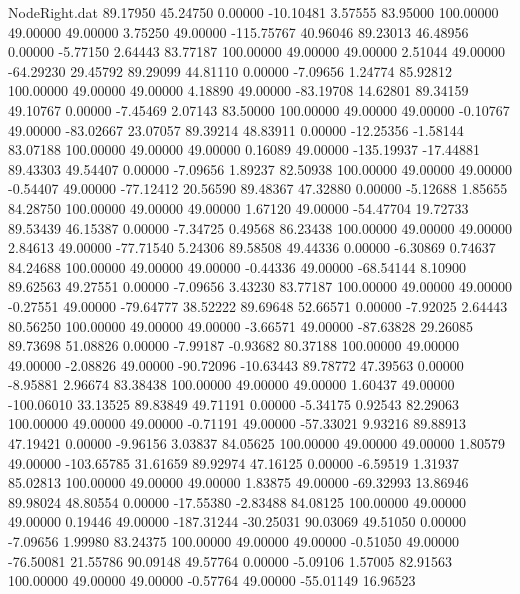 \begin{filecontents}{NodeRight.dat}
  89.17950   45.24750    0.00000   -10.10481    3.57555   83.95000  100.00000   49.00000   49.00000    3.75250   49.00000 -115.75767   40.96046
  89.23013   46.48956    0.00000    -5.77150    2.64443   83.77187  100.00000   49.00000   49.00000    2.51044   49.00000  -64.29230   29.45792
  89.29099   44.81110    0.00000    -7.09656    1.24774   85.92812  100.00000   49.00000   49.00000    4.18890   49.00000  -83.19708   14.62801
  89.34159   49.10767    0.00000    -7.45469    2.07143   83.50000  100.00000   49.00000   49.00000   -0.10767   49.00000  -83.02667   23.07057
  89.39214   48.83911    0.00000   -12.25356   -1.58144   83.07188  100.00000   49.00000   49.00000    0.16089   49.00000 -135.19937  -17.44881
  89.43303   49.54407    0.00000    -7.09656    1.89237   82.50938  100.00000   49.00000   49.00000   -0.54407   49.00000  -77.12412   20.56590
  89.48367   47.32880    0.00000    -5.12688    1.85655   84.28750  100.00000   49.00000   49.00000    1.67120   49.00000  -54.47704   19.72733
  89.53439   46.15387    0.00000    -7.34725    0.49568   86.23438  100.00000   49.00000   49.00000    2.84613   49.00000  -77.71540    5.24306
  89.58508   49.44336    0.00000    -6.30869    0.74637   84.24688  100.00000   49.00000   49.00000   -0.44336   49.00000  -68.54144    8.10900
  89.62563   49.27551    0.00000    -7.09656    3.43230   83.77187  100.00000   49.00000   49.00000   -0.27551   49.00000  -79.64777   38.52222
  89.69648   52.66571    0.00000    -7.92025    2.64443   80.56250  100.00000   49.00000   49.00000   -3.66571   49.00000  -87.63828   29.26085
  89.73698   51.08826    0.00000    -7.99187   -0.93682   80.37188  100.00000   49.00000   49.00000   -2.08826   49.00000  -90.72096  -10.63443
  89.78772   47.39563    0.00000    -8.95881    2.96674   83.38438  100.00000   49.00000   49.00000    1.60437   49.00000 -100.06010   33.13525
  89.83849   49.71191    0.00000    -5.34175    0.92543   82.29063  100.00000   49.00000   49.00000   -0.71191   49.00000  -57.33021    9.93216
  89.88913   47.19421    0.00000    -9.96156    3.03837   84.05625  100.00000   49.00000   49.00000    1.80579   49.00000 -103.65785   31.61659
  89.92974   47.16125    0.00000    -6.59519    1.31937   85.02813  100.00000   49.00000   49.00000    1.83875   49.00000  -69.32993   13.86946
  89.98024   48.80554    0.00000   -17.55380   -2.83488   84.08125  100.00000   49.00000   49.00000    0.19446   49.00000 -187.31244  -30.25031
  90.03069   49.51050    0.00000    -7.09656    1.99980   83.24375  100.00000   49.00000   49.00000   -0.51050   49.00000  -76.50081   21.55786
  90.09148   49.57764    0.00000    -5.09106    1.57005   82.91563  100.00000   49.00000   49.00000   -0.57764   49.00000  -55.01149   16.96523

\end{filecontents}
